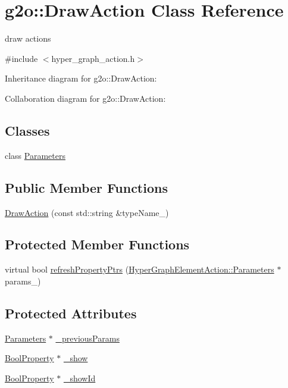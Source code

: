 \hypertarget{classg2o_1_1DrawAction}{}\section{g2o\+:\+:Draw\+Action Class Reference}
\label{classg2o_1_1DrawAction}


draw actions  




{\ttfamily \#include $<$hyper\+\_\+graph\+\_\+action.\+h$>$}



Inheritance diagram for g2o\+:\+:Draw\+Action\+:


Collaboration diagram for g2o\+:\+:Draw\+Action\+:
\subsection*{Classes}
\begin{DoxyCompactItemize}
\item 
class \hyperlink{classg2o_1_1DrawAction_1_1Parameters}{Parameters}
\end{DoxyCompactItemize}
\subsection*{Public Member Functions}
\begin{DoxyCompactItemize}
\item 
\hyperlink{classg2o_1_1DrawAction_a6b876d6a30fa564176dc6a3caefa572e}{Draw\+Action} (const std\+::string \&type\+Name\+\_\+)
\end{DoxyCompactItemize}
\subsection*{Protected Member Functions}
\begin{DoxyCompactItemize}
\item 
virtual bool \hyperlink{classg2o_1_1DrawAction_a9556cd6f8d1f842d45e046e1770699b0}{refresh\+Property\+Ptrs} (\hyperlink{structg2o_1_1HyperGraphElementAction_1_1Parameters}{Hyper\+Graph\+Element\+Action\+::\+Parameters} $\ast$params\+\_\+)
\end{DoxyCompactItemize}
\subsection*{Protected Attributes}
\begin{DoxyCompactItemize}
\item 
\hyperlink{classg2o_1_1DrawAction_1_1Parameters}{Parameters} $\ast$ \hyperlink{classg2o_1_1DrawAction_af598eb77ea4e27a1c0a27533c971639d}{\+\_\+previous\+Params}
\item 
\hyperlink{namespaceg2o_a28e624fedcafeb2b049be2930421071f}{Bool\+Property} $\ast$ \hyperlink{classg2o_1_1DrawAction_a1ec3a46473daeb8ac65e6a523a9248b6}{\+\_\+show}
\item 
\hyperlink{namespaceg2o_a28e624fedcafeb2b049be2930421071f}{Bool\+Property} $\ast$ \hyperlink{classg2o_1_1DrawAction_ab5f870bf2a931e64bc994c87c4212ad3}{\+\_\+show\+Id}
\end{DoxyCompactItemize}
